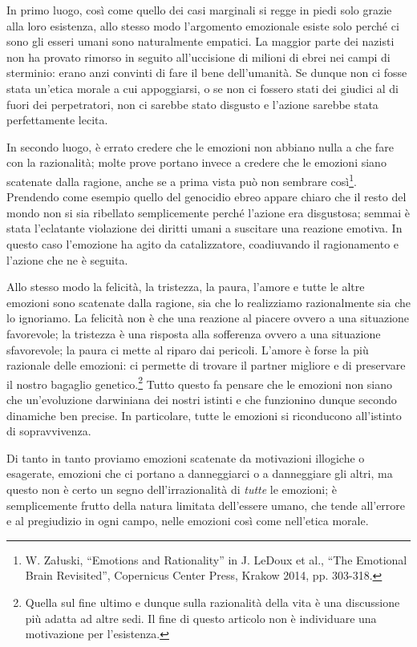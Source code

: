 \documentclass[a4paper,11pt,oneside,article]{memoir}
\begin{document}
In primo luogo, così come quello dei casi marginali si regge in piedi solo
grazie alla loro esistenza, allo stesso modo l'argomento emozionale esiste solo
perché ci sono gli esseri umani sono naturalmente empatici. La maggior parte dei
nazisti non ha provato rimorso in seguito all'uccisione di milioni di ebrei nei
campi di sterminio: erano anzi convinti di fare il bene dell'umanità. Se dunque
non ci fosse stata un'etica morale a cui appoggiarsi, o se non ci fossero stati
dei giudici al di fuori dei perpetratori, non ci sarebbe stato disgusto e
l'azione sarebbe stata perfettamente lecita.

In secondo luogo, è errato credere che le emozioni non abbiano nulla a che fare
con la razionalità; molte prove portano invece a credere che le emozioni siano
scatenate dalla ragione, anche se a prima vista può non sembrare
così\footnote{W. Załuski, ``Emotions and Rationality'' in J. LeDoux et al.,
``The Emotional Brain Revisited'', Copernicus Center Press, Krakow 2014, pp.
303-318.}. Prendendo come esempio quello del genocidio ebreo appare chiaro che
il resto del mondo non si sia ribellato semplicemente perché l'azione era
disgustosa; semmai è stata l'eclatante violazione dei diritti umani a suscitare
una reazione emotiva. In questo caso l'emozione ha agito da catalizzatore,
coadiuvando il ragionamento e l'azione che ne è seguita.

Allo stesso modo la felicità, la tristezza, la paura, l'amore e tutte le altre
emozioni sono scatenate dalla ragione, sia che lo realizziamo razionalmente sia
che lo ignoriamo. La felicità non è che una reazione al piacere ovvero a una
situazione favorevole; la tristezza è una risposta alla sofferenza ovvero a una
situazione sfavorevole; la paura ci mette al riparo dai pericoli. L'amore è
forse la più razionale delle emozioni: ci permette di trovare il partner
migliore e di preservare il nostro bagaglio genetico.\footnote{Quella sul fine
ultimo e dunque sulla razionalità della vita è una discussione più adatta ad
altre sedi. Il fine di questo articolo non è individuare una motivazione per
l'esistenza.} Tutto questo fa pensare che le emozioni non siano che
un'evoluzione darwiniana dei nostri istinti e che funzionino dunque secondo
dinamiche ben precise. In particolare, tutte le emozioni si riconducono
all'istinto di sopravvivenza.

Di tanto in tanto proviamo emozioni scatenate da motivazioni illogiche o
esagerate, emozioni che ci portano a danneggiarci o a danneggiare gli altri, ma
questo non è certo un segno dell'irrazionalità di \emph{tutte} le emozioni; è
semplicemente frutto della natura limitata dell'essere umano, che tende
all'errore e al pregiudizio in ogni campo, nelle emozioni così come nell'etica
morale.
\end{document}

